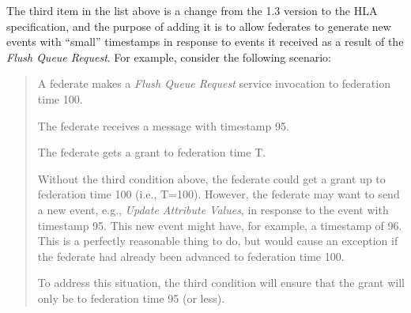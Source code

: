\begin{annexstdpage}
    The third item in the list above is a change from the 1.3 version to the HLA specification, and the purpose of adding it is to allow federates to generate new events with ``small'' timestamps in response to events it received as a result of the \textit{Flush Queue Request}. For example, consider the following scenario:

    \begin{quote}
        A federate makes a \textit{Flush Queue Request} service invocation to federation time 100.

        The federate receives a message with timestamp 95.

        The federate gets a grant to federation time T.

        Without the third condition above, the federate could get a grant up to federation time 100 (i.e., T=100). However, the federate may want to send a new event, e.g., \textit{Update Attribute Values}, in response to the event with timestamp 95. This new event might have, for example, a timestamp of 96. This is a perfectly reasonable thing to do, but would cause an exception if the federate had already been advanced to federation time 100.

        To address this situation, the third condition will ensure that the grant will only be to federation time 95 (or less).
    \end{quote}
\end{annexstdpage}

\clearpage

